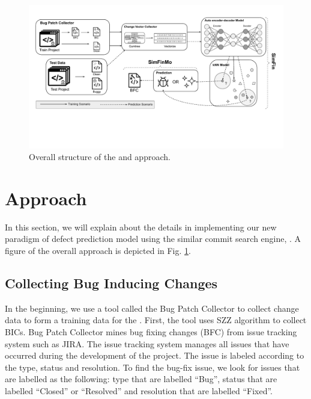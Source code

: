 \begin{figure}[!tbp]
    \renewcommand{\arraystretch}{1}
        \centering
        \includegraphics[width=\textwidth]{figures/approach_fig.pdf}\hfill
        \caption{Overall structure of the {\simfin} and {\simfinmo} approach.}
        \label{fig:approach}
    \end{figure}
    
     
    \section{Approach}
    In this section, we will explain about the details in implementing our new paradigm of defect prediction model using the similar commit search engine, {\simfin}. A figure of the overall approach is depicted in Fig. \ref{fig:approach}.
    
    \subsection{Collecting Bug Inducing Changes}
    In the beginning, we use a tool called the Bug Patch Collector to collect change data to form a training data for the {\simfin}.
    First, the tool uses SZZ algorithm \cite{sliwerski2005changes} to collect BICs. 
    Bug Patch Collector mines bug fixing changes (BFC) from issue tracking system such as JIRA.
    The issue tracking system manages all issues that have occurred during the development of the project.
    The issue is labeled according to the type, status and resolution.
    To find the bug-fix issue, we look for issues that are labelled as the following: type that are labelled ``Bug'', status that are labelled ``Closed'' or ``Resolved'' and resolution that are labelled ``Fixed''.
    
